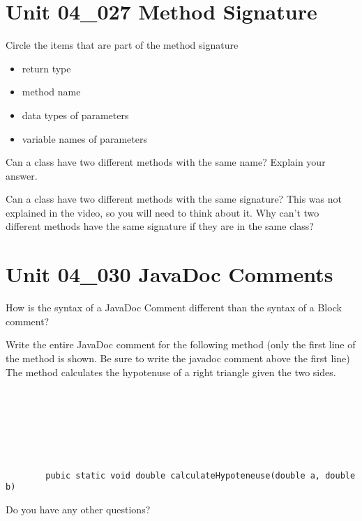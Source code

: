 \documentclass[letterpaper,12pt]{exam}
\newcommand{\unit}{Unit 04}
\begin{document}
\begin{questions}
\section*{\unit\_027 Method Signature} %
\begin{samepage}
	\question Circle the items that are part of the method signature
	  \begin{itemize}
		\item return type
		\vspace{5mm}
		\item method name
		\vspace{5mm}
		\item data types of parameters
		\vspace{5mm}
		\item variable names of parameters
		\vspace{5mm}
	   \end{itemize}
\end{samepage}

\begin{samepage}
	\question Can a class have two different methods with the same name?  Explain your answer.
	\vspace{5mm}
\end{samepage}
\begin{samepage}
	\question Can a class have two different methods with the same signature?  This was not explained in the video, so you will need to think about it.  Why can't two different methods have the same signature if they are in the same class?
	\vspace{5mm}
\end{samepage}
\section*{\unit\_030 JavaDoc Comments} %
\begin{samepage}
	\question How is the syntax of a JavaDoc Comment different than the syntax of a Block comment?
	\vspace{5mm}
\end{samepage}
\begin{samepage}
	\question Write the entire JavaDoc comment for the following method (only the first line of the method is shown.  Be sure to write the javadoc comment above the first line) The method calculates the hypotenuse of a right triangle given the two sides.
	\vspace{5mm}
	\begin{verbatim}
		






		pubic static void double calculateHypoteneuse(double a, double b)
	\end{verbatim}
\end{samepage}

\begin{samepage}
	\question Do you have any other questions?
	\vspace{30mm}
\end{samepage}

\end{questions}
\end{document}
